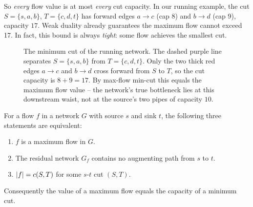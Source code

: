 So \emph{every} flow value is at most \emph{every} cut capacity. In our running
example, the cut $S = \{s,a,b\}$, $T=\{c,d,t\}$ has forward edges $a\to c$ (cap
8) and $b\to d$ (cap 9), capacity $17$. Weak duality already guarantees the
maximum flow cannot exceed 17. In fact, this bound is always
\emph{tight}: some flow achieves the smallest cut.

\begin{figure}[H]
\centering
{}
\caption{The minimum cut of the running network. The dashed purple line
separates $S=\{s,a,b\}$ from $T=\{c,d,t\}$. Only the two thick red edges $a\to
c$ and $b\to d$ cross forward from $S$ to $T$, so the cut capacity is $8+9=17$.
By max-flow min-cut this equals the maximum flow value -- the network's true
bottleneck lies at this downstream waist, not at the source's two pipes of
capacity $10$.}
\label{ch26:fig-mincut}
\end{figure}

\begin{theorem}
\label{ch26:mfmc}
For a flow $f$ in a network $G$ with source $s$ and sink $t$, the following
three statements are equivalent:
\begin{enumerate}
  \item $f$ is a maximum flow in $G$.
  \item The residual network $G_f$ contains no augmenting path from $s$ to $t$.
  \item $\lvert f\rvert = c(S,T)$ for some $s$-$t$ cut $(S,T)$.
\end{enumerate}
Consequently the value of a maximum flow equals the capacity of a minimum cut.
\end{theorem}

